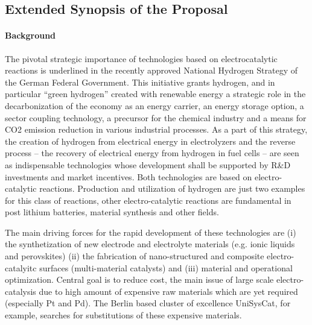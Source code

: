 \documentclass[a4paper,10pt]{article}
\begin{document}
\insertProjectHeader


\subsection*{Extended Synopsis of the Proposal}

\paragraph{Background}



The pivotal strategic importance of  technologies based on electrocatalytic reactions
is underlined in  the  recently  approved  National Hydrogen  Strategy of  the  German
Federal  Government. This initiative  grants  hydrogen,  and  in   particular  ``green
hydrogen''  created with  renewable  energy a  strategic  role in  the
decarbonization of the economy as an energy carrier, an energy storage
option, a  sector coupling  technology, a  precursor for  the chemical
industry  and a  means  for  CO2  emission reduction  in  various
industrial  processes. 
As  a part  of this  strategy, the  creation of
hydrogen  from  electrical energy  in  electrolyzers  and the  reverse
process --  the recovery  of electrical energy  from hydrogen  in fuel
cells -- are seen  as indispensable technologies whose development
shall be  supported by  R\&D investments  and market  incentives.
%
Both technologies are based  on electro-catalytic reactions. Production
and utilization  of hydrogen are just  two examples for this  class of
reactions, other  electro-catalytic reactions  are fundamental  in post
lithium  batteries,  material  synthesis  and  other  fields. 

The main driving forces for the rapid development of these technologies are (i) the synthetization of new electrode and electrolyte materials (e.g. ionic liquids and perovskites) (ii) the fabrication of nano-structured and composite electro-catalyitc surfaces (multi-material catalysts) and (iii) material and operational optimization. Central goal is to reduce cost, the main issue of large scale electro-catalysis due to high amount of expensive raw materials which are yet required (especially Pt and Pd). The Berlin based cluster of excellence UniSysCat, for example, searches for substitutions of these expensive materials.
\end{document}

